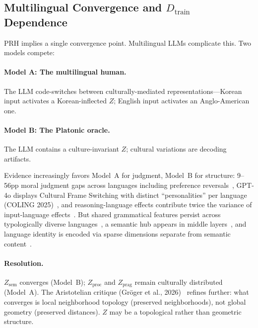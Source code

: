 \documentclass{article}
\theoremstyle{definition}
\newcommand{\Zsem}{Z_{\text{sem}}}
\newcommand{\Zproc}{Z_{\text{proc}}}
\newcommand{\Zprag}{Z_{\text{prag}}}
\newcommand{\Dtrain}{D_{\text{train}}}
\begin{document}
\subsection{Multilingual Convergence and $\Dtrain$ Dependence}\label{sec:dtrain}

PRH implies a single convergence point. Multilingual LLMs complicate this. Two models compete:

\paragraph{Model A: The multilingual human.}
The LLM code-switches between culturally-mediated representations---Korean input activates a Korean-inflected $Z$; English input activates an Anglo-American one.

\paragraph{Model B: The Platonic oracle.}
The LLM contains a culture-invariant $Z$; cultural variations are decoding artifacts.

Evidence increasingly favors Model~A for judgment, Model~B for structure: 9--56pp moral judgment gaps across languages including preference reversals~\citep{vida2024moral,agarwal2024ethical}, GPT-4o displays Cultural Frame Switching with distinct ``personalities'' per language (COLING 2025)~\citep{ahn2025coling}, and reasoning-language effects contribute twice the variance of input-language effects~\citep{li2026reasoning}. But shared grammatical features persist across typologically diverse languages~\citep{brinkmann2025shared}, a semantic hub appears in middle layers~\citep{wu2025semantichub}, and language identity is encoded via sparse dimensions separate from semantic content~\citep{zhong2025sparse}.

\paragraph{Resolution.}
$\Zsem$ converges (Model~B); $\Zproc$ and $\Zprag$ remain culturally distributed (Model~A). The Aristotelian critique (Gr\"{o}ger et al., 2026)~\citep{groger2026aristotelian} refines further: what converges is local neighborhood topology (preserved neighborhoods), not global geometry (preserved distances). $Z$ may be a topological rather than geometric structure.
\end{document}
